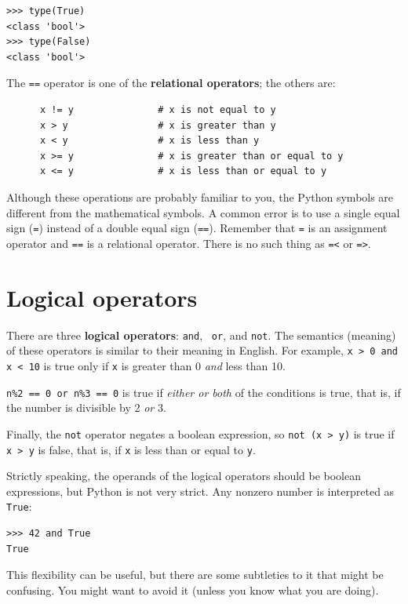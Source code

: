 \documentclass[10pt]{book}
\begin{document}
\begin{verbatim}
>>> type(True)
<class 'bool'>
>>> type(False)
<class 'bool'>
\end{verbatim}
%
The {\tt ==} operator is one of the {\bf relational operators}; the
others are:

\begin{verbatim}
      x != y               # x is not equal to y
      x > y                # x is greater than y
      x < y                # x is less than y
      x >= y               # x is greater than or equal to y
      x <= y               # x is less than or equal to y
\end{verbatim}
%
Although these operations are probably familiar to you, the Python
symbols are different from the mathematical symbols.  A common error
is to use a single equal sign ({\tt =}) instead of a double equal sign
({\tt ==}).  Remember that {\tt =} is an assignment operator and
{\tt ==} is a relational operator.   There is no such thing as
{\tt =<} or {\tt =>}.


\section {Logical operators}

There are three {\bf logical operators}: {\tt and}, {\tt
or}, and {\tt not}.  The semantics (meaning) of these operators is
similar to their meaning in English.  For example,
{\tt x > 0 and x < 10} is true only if {\tt x} is greater than 0
{\em and} less than 10.

{\tt n\%2 == 0 or n\%3 == 0} is true if {\em either or both} of the
conditions is true, that is, if the number is divisible by 2 {\em or}
3.

Finally, the {\tt not} operator negates a boolean
expression, so {\tt not (x > y)} is true if {\tt x > y} is false,
that is, if {\tt x} is less than or equal to {\tt y}.

Strictly speaking, the operands of the logical operators should be
boolean expressions, but Python is not very strict.
Any nonzero number is interpreted as {\tt True}:

\begin{verbatim}
>>> 42 and True
True
\end{verbatim}
%
This flexibility can be useful, but there are some subtleties to
it that might be confusing.  You might want to avoid it (unless
you know what you are doing).
\end{document}
